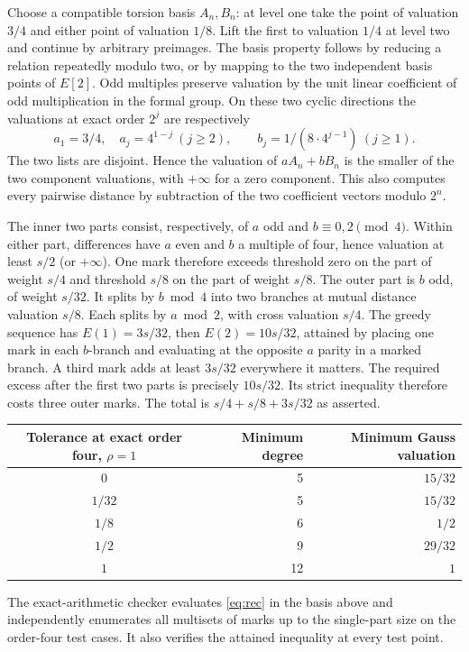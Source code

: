 Choose a compatible torsion basis $A_n,B_n$: at level one take the point
of valuation $3/4$ and either point of valuation $1/8$. Lift the first
to valuation $1/4$ at level two and continue by arbitrary preimages.
The basis property follows by reducing a relation repeatedly modulo two,
or by mapping to the two independent basis points of $E[2]$.
Odd multiples preserve valuation by the unit linear coefficient of
odd multiplication in the formal group. On these two cyclic directions
the valuations at exact order $2^j$ are respectively
\[
 a_1=3/4,\quad a_j=4^{1-j}\ (j\ge2),\qquad
 b_j=1/(8\cdot4^{j-1})\ (j\ge1).
\]
The two lists are disjoint. Hence the valuation of $a A_n+b B_n$
is the smaller of the two component valuations, with $+\infty$ for
a zero component. This also computes every pairwise distance by
subtraction of the two coefficient vectors modulo $2^n$.

The inner two parts consist, respectively, of $a$ odd and
$b\equiv0,2\pmod4$. Within either part, differences have $a$ even
and $b$ a multiple of four, hence valuation at least $s/2$
(or $+\infty$). One mark therefore exceeds threshold zero on the
part of weight $s/4$ and threshold $s/8$ on the part of weight $s/8$.
The outer part is $b$ odd, of weight $s/32$. It splits by $b\bmod4$ into
two branches at mutual distance valuation $s/8$. Each splits by
$a\bmod2$, with cross valuation $s/4$. The greedy sequence has
$E(1)=3s/32$, then $E(2)=10s/32$, attained by placing one mark in
each $b$-branch and evaluating at the opposite $a$ parity in a marked
branch. A third mark adds at least $3s/32$ everywhere it matters.
The required excess after the first two parts is precisely $10s/32$.
Its strict inequality therefore costs three outer marks. The total is
$s/4+s/8+3s/32$ as asserted.

\begin{center}
\begin{tabular}{@{}crr@{}}\toprule
Tolerance at exact order four, $\rho=1$ & Minimum degree & Minimum Gauss valuation\\
\midrule
$0$ &5&$15/32$\\
$1/32$ &5&$15/32$\\
$1/8$ &6&$1/2$\\
$1/2$ &9&$29/32$\\
$1$ &12&$1$\\
\bottomrule\end{tabular}
\end{center}
The exact-arithmetic checker evaluates \eqref{eq:rec} in the basis above
and independently enumerates all multisets of marks up to the single-part
size on the order-four test cases. It also verifies the attained
inequality at every test point.
